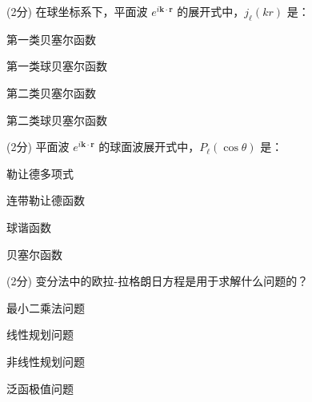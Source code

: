 \documentclass{njustexam}
\begin{document}
                    \begin{problem}{(2分)}
                    在球坐标系下，平面波 $e^{i\mathbf{k} \cdot \mathbf{r}}$ 的展开式中，$j_{\ell}(kr)$ 是：
                    \begin{abcd}
                    \item 第一类贝塞尔函数
                    \item 第一类球贝塞尔函数
                    \item 第二类贝塞尔函数
                    \item 第二类球贝塞尔函数
                    \end{abcd}
                    \end{problem}
                    
                    \begin{problem}{(2分)}
                    平面波 $e^{i\mathbf{k} \cdot \mathbf{r}}$ 的球面波展开式中，$P_{\ell}(\cos \theta)$ 是：
                    \begin{abcd}
                    \item 勒让德多项式
                    \item 连带勒让德函数
                    \item 球谐函数
                    \item 贝塞尔函数
                    \end{abcd}
                    \end{problem}

                \begin{problem}{(2分)}
                    变分法中的欧拉-拉格朗日方程是用于求解什么问题的？
                    \begin{abcd}
                    \item 最小二乘法问题
                    \item 线性规划问题
                    \item 非线性规划问题
                    \item 泛函极值问题
                    \end{abcd}
                    \end{problem}
                    
\end{document}
